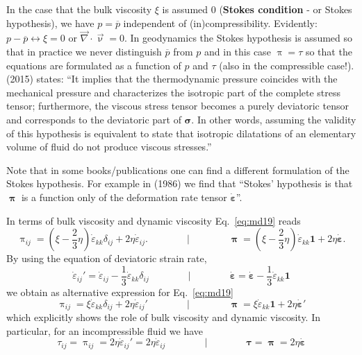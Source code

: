 \begin{remark}
In the case that the bulk viscosity $\xi$ is assumed 0 ({\bf Stokes condition} - or Stokes hypothesis), 
we have $p = \overline{p}$ 
independent of (in)compressibility. Evidently: $p - \overline{p} \leftrightarrow \xi=0$
or $\vec\nabla \cdot \vec\upnu= 0$.
In geodynamics the Stokes hypothesis is assumed so that in practice we never 
distinguish $\overline{p}$ from $p$
and in this case $\uppi=\tau$ so that the equations are formulated as a function 
of $p$ and $\tau$ (also in the 
compressible case!).
\textcite{bure15} (2015) states: ``It implies that the thermodynamic pressure
coincides with the mechanical pressure and characterizes the isotropic part of 
the complete stress tensor; furthermore, the viscous stress tensor becomes a purely 
deviatoric tensor and corresponds to the deviatoric part of ${\bm \sigma}$. 
In other words, assuming the validity of this hypothesis is equivalent to state that isotropic dilatations
of an elementary volume of fluid do not produce viscous stresses.''

Note that in some books/publications one can find a different formulation of the Stokes hypothesis.
For example in \textcite{caod86} (1986) we find that ``Stokes' hypothesis is that ${\bm\uppi}$ is a function
only of the deformation rate tensor $\dot{\bm\varepsilon}$''.
\end{remark}

In terms of bulk viscosity and dynamic viscosity Eq.~\eqref{eq:md19} reads
\begin{equation}
\uppi_{ij} = \left(\xi-\frac23 \eta \right) \dot\varepsilon_{kk} \delta_{ij} + 2\eta \dot\varepsilon_{ij}.
\qquad
\qquad
\bigg\rvert
\qquad
\qquad
{\bm \uppi} = \left(\xi-\frac23 \eta \right) \dot\varepsilon_{kk} {\bm 1} + 2\eta \dot{\bm \varepsilon}.
\label{eq:piij}
\end{equation}
By using the equation of deviatoric strain rate,
\begin{equation}
\dot\varepsilon_{ij}' = \dot\varepsilon_{ij} -\frac13  \dot\varepsilon_{kk} \delta_{ij}
\qquad
\qquad
\bigg\rvert
\qquad
\qquad
\dot{\bm \varepsilon} = \dot{\bm \varepsilon} - \frac13 \dot\varepsilon_{kk} {\bm 1}
\end{equation}
we obtain as alternative expression for Eq.~\eqref{eq:md19}
\begin{equation}
\uppi_{ij} = \xi  \dot\varepsilon_{kk} \delta_{ij} + 2 \eta \dot\varepsilon_{ij}'
\qquad
\qquad
\bigg\rvert
\qquad
\qquad
{\bm \uppi} = \xi \dot\varepsilon_{kk} {\bm 1} + 2 \eta \dot{\bm \varepsilon}'
\label{eq:md21}
\end{equation}
which explicitly shows the role of bulk viscosity and dynamic viscosity. In particular, for
an incompressible fluid we have
\begin{equation}
\tau_{ij}=\uppi_{ij}=2\eta \dot\varepsilon_{ij}' = 2 \eta \dot\varepsilon_{ij}
\qquad
\qquad
\bigg\rvert
\qquad
\qquad
{\bm \tau} = {\bm \uppi} = 2 \eta \dot{\bm \varepsilon}
\label{eq:md22}
\end{equation}

